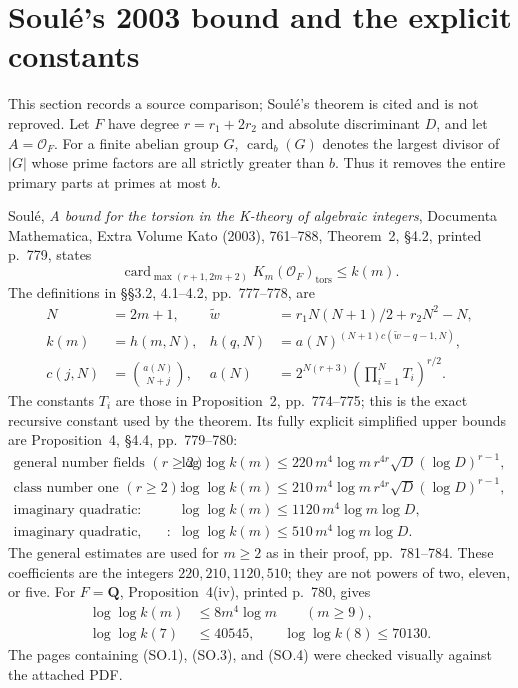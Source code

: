 \section{Soul\'e's 2003 bound and the explicit constants}
\label{sec:soule}

This section records a source comparison; Soul\'e's theorem
is cited and is not reproved. Let $F$ have degree
$r=r_1+2r_2$ and absolute discriminant $D$, and let
$A=\mathcal O_F$. For a finite abelian group $G$,
$\operatorname{card}_b(G)$ denotes the largest divisor of
$|G|$ whose prime factors are all strictly greater than $b$.
Thus it removes the entire primary parts at primes at most $b$.

Soul\'e, \emph{A bound for the torsion in the K-theory of
algebraic integers}, Documenta Mathematica, Extra Volume Kato
(2003), 761--788, Theorem~2, \S4.2, printed p.~779, states
\[
 \operatorname{card}_{\max(r+1,2m+2)}
       K_m(\mathcal O_F)_{\mathrm{tors}}\leq k(m).
 \tag{SO.1}
\]
The definitions in \S\S3.2, 4.1--4.2, pp.~777--778, are
\[
\begin{aligned}
 N&=2m+1,&
 \widetilde w&=r_1N(N+1)/2+r_2N^2-N,\\
 k(m)&=h(m,N),&
 h(q,N)&=a(N)^{(N+1)c(\widetilde w-q-1,N)},\\
 c(j,N)&=\binom{a(N)}{N+j},&
 a(N)&=2^{N(r+3)}
                  \left(\prod_{i=1}^N T_i\right)^{r/2}.
\end{aligned}
 \tag{SO.2}
\]
The constants $T_i$ are those in Proposition~2,
pp.~774--775; this is the exact recursive constant used by
the theorem. Its fully explicit simplified upper bounds
are Proposition~4, \S4.4, pp.~779--780:
\[
\begin{array}{ll}
\text{general number fields }(r\geq2):&
 \log\log k(m)\leq220\,m^4\log m\,
                   r^{4r}\sqrt D(\log D)^{r-1},\\[2pt]
\text{class number one }(r\geq2):&
 \log\log k(m)\leq210\,m^4\log m\,
                   r^{4r}\sqrt D(\log D)^{r-1},\\[2pt]
\text{imaginary quadratic}:&
 \log\log k(m)\leq1120\,m^4\log m\log D,\\[2pt]
\text{imaginary quadratic, class number one}:&
 \log\log k(m)\leq510\,m^4\log m\log D.
\end{array}
 \tag{SO.3}
\]
The general estimates are used for $m\geq2$ as in their proof,
pp.~781--784. These coefficients are the integers
$220,210,1120,510$; they are not powers of two, eleven, or five.
For $F=\mathbf Q$, Proposition~4(iv), printed p.~780, gives
\[
\begin{aligned}
 \log\log k(m)&\leq8m^4\log m\qquad(m\geq9),\\
 \log\log k(7)&\leq40545,\qquad
 \log\log k(8)\leq70130.
\end{aligned}
 \tag{SO.4}
\]
The pages containing (SO.1), (SO.3), and (SO.4) were checked
visually against the attached PDF.

